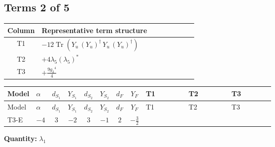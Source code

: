 \documentclass[8pt]{article}
\begin{document}
\begin{landscape}
\subsection*{Terms 2 of 5}
\begin{center}
\begin{tabular}{@{}c >{\raggedright\arraybackslash}p{0.82\linewidth}@{}}
\toprule
Column & Representative term structure \\
\midrule
T1 & \(\displaystyle -12 \operatorname{Tr}\!\left({Y_u}\,\left({Y_u}\right)^{\dagger}\,{Y_u}\,\left({Y_u}\right)^{\dagger}\right)\) \\
\midrule
T2 & \(\displaystyle +4 {\lambda_5} \left({\lambda_5}\right)^{*}\) \\
\midrule
T3 & \(\displaystyle +\frac{9 {g_2}^4}{4}\) \\
\midrule
\bottomrule
\end{tabular}
\end{center}
\smallskip
\tiny
\begin{longtable}{@{}llcccccc >{\raggedright\arraybackslash}p{0.21\linewidth} >{\raggedright\arraybackslash}p{0.21\linewidth} >{\raggedright\arraybackslash}p{0.21\linewidth}@{}}
\toprule
Model & $\alpha$ & $d_{S_1}$ & $Y_{S_1}$ & $d_{S_2}$ & $Y_{S_2}$ & $d_F$ & $Y_F$ & T1 & T2 & T3 \\
\midrule
\endfirsthead
\toprule
Model & $\alpha$ & $d_{S_1}$ & $Y_{S_1}$ & $d_{S_2}$ & $Y_{S_2}$ & $d_F$ & $Y_F$ & T1 & T2 & T3 \\
\midrule
\endhead
T3-E & $-4$ & $3$ & $-2$ & $3$ & $-1$ & $2$ & $-\frac{3}{2}$ & \scriptsize\adjustbox{max width=\linewidth}{$\begin{gathered} -12 \operatorname{Tr}\!\left({Y_u}\,\left({Y_u}\right)^{\dagger}\,{Y_u}\,\left({Y_u}\right)^{\dagger}\right)\end{gathered}$} & \scriptsize\adjustbox{max width=\linewidth}{$\begin{gathered} +4 {\lambda_5} \left({\lambda_5}\right)^{*}\end{gathered}$} & \scriptsize\adjustbox{max width=\linewidth}{$\begin{gathered} +\frac{9 {g_2}^4}{4}\end{gathered}$} \\
\midrule
\bottomrule
\end{longtable}
\clearpage
\noindent\textbf{Quantity: }$\lambda_1$\par\smallskip

\end{landscape}
\end{document}
